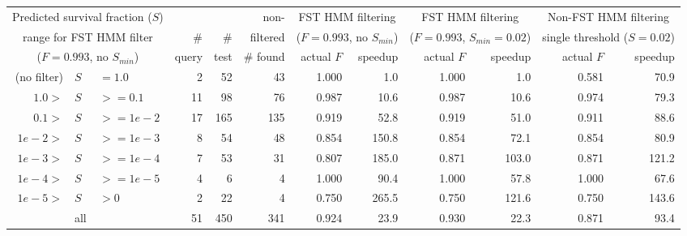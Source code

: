 \begin{tabular}{rllrrr|rr|rr|rr} 
\multicolumn{3}{c}{Predicted survival fraction ($S$)}&& & non-     & \multicolumn{2}{c|}{FST HMM filtering}           & \multicolumn{2}{c|}{FST HMM filtering}             & \multicolumn{2}{c}{Non-FST HMM filtering} \\
\multicolumn{3}{c}{range for FST HMM filter}         &\#&\#& filtered & \multicolumn{2}{c|}{($F=0.993$, no $S_{min}$)}   & \multicolumn{2}{c|}{($F=0.993$, $S_{min}=0.02$)}   & \multicolumn{2}{c}{single threshold ($S=0.02$)} \\ \cline{7-12}
\multicolumn{3}{c}{($F=0.993$, no $S_{min}$)}        & query & test & \# found &actual $F$& speedup                               & actual $F$& speedup                                &actual $F$& speedup            \\\hline                    
(no filter) & $S$ &$=1.0$& 2      &  52    & 43       & 1.000    &   1.0                                 & 1.000    &   1.0                                   & 0.581    &  70.9 \\                               
$1.0 >$& $S$ &$>= 0.1$& 11     &  98    & 76       & 0.987    &  10.6                                 & 0.987    &  10.6                                   & 0.974    &  79.3 \\                               
$0.1 >$& $S$ &$>=1e-2$& 17     & 165    & 135      & 0.919    &  52.8                                 & 0.919    &  51.0                                   & 0.911    &  88.6 \\                               
$1e-2>$& $S$ &$>=1e-3$&  8     &  54    & 48       & 0.854    & 150.8                                 & 0.854    &  72.1                                   & 0.854    &  80.9 \\                               
$1e-3>$& $S$ &$>=1e-4$&  7     &  53    & 31       & 0.807    & 185.0                                 & 0.871    & 103.0                                   & 0.871    & 121.2 \\                               
$1e-4>$& $S$ &$>=1e-5$&  4     &   6    & 4        & 1.000    &  90.4                                 & 1.000    &  57.8                                   & 1.000    &  67.6 \\                                
$1e-5>$& $S$ &$>  0  $&  2     &  22    & 4        & 0.750    & 265.5                                 & 0.750    & 121.6                                   & 0.750    & 143.6 \\ \hline
       & all &        & 51     & 450    & 341      & 0.924    &  23.9                                 & 0.930    &  22.3                                   & 0.871    &  93.4 \\                               
\end{tabular}
